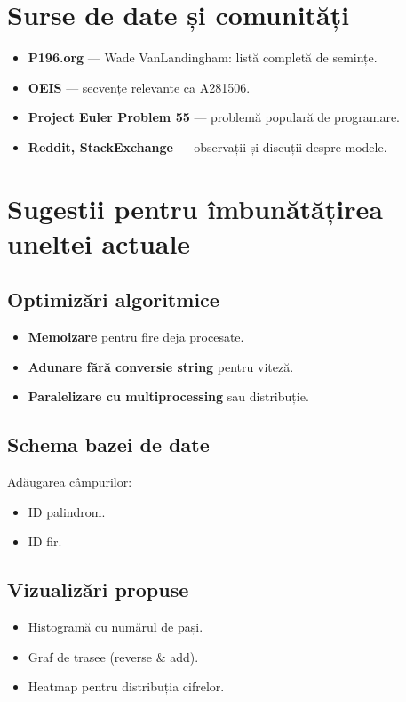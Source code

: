 \documentclass[12pt]{article}
\begin{document}
\section{Surse de date și comunități}
\begin{itemize}
    \item \textbf{P196.org} — Wade VanLandingham: listă completă de semințe.
    \item \textbf{OEIS} — secvențe relevante ca A281506.
    \item \textbf{Project Euler Problem 55} — problemă populară de programare.
    \item \textbf{Reddit, StackExchange} — observații și discuții despre modele.
\end{itemize}

\section{Sugestii pentru îmbunătățirea uneltei actuale}
\subsection{Optimizări algoritmice}
\begin{itemize}
    \item \textbf{Memoizare} pentru fire deja procesate.
    \item \textbf{Adunare fără conversie string} pentru viteză.
    \item \textbf{Paralelizare cu multiprocessing} sau distribuție.
\end{itemize}

\subsection{Schema bazei de date}
Adăugarea câmpurilor:
\begin{itemize}
    \item ID palindrom.
    \item ID fir.
\end{itemize}

\subsection{Vizualizări propuse}
\begin{itemize}
    \item Histogramă cu numărul de pași.
    \item Graf de trasee (reverse \& add).
    \item Heatmap pentru distribuția cifrelor.
\end{itemize}
\end{document}
